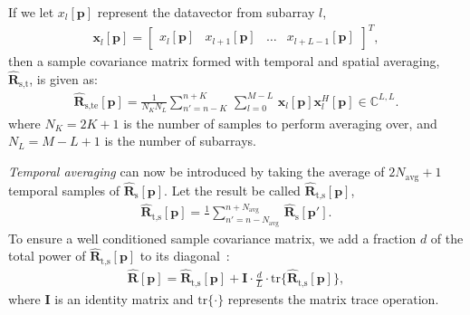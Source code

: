 \documentclass[12pt,journal,captionsoff,onecolumn]{IEEEtran}
\newcommand\bmat[1]{\begin{bmatrix}#1\end{bmatrix}}
\newcommand\tr{\text{tr}}
\newcommand\sumb[2]{\sum\limits_{#1}^{#2}\,}
\newcommand\T{^{\scriptscriptstyle T}}
\renewcommand\H{^{\scriptscriptstyle H}}
\renewcommand\vec[1]{\boldsymbol{#1}}
\newcommand\mat[1]{\boldsymbol{#1}}
\newcommand\1{\vec 1}
\newcommand\I{\mat I}
\newcommand*\p{\vec p}
\newcommand*\x{\vec x}
\newcommand*\eR{\mat{\hat R}}
\begin{document}
If we let $x_l[\p]$ represent the datavector from subarray $l$,
\begin{gather}
\x_l[\p] = \bmat{x_l[\p] & x_{l+1}[\p] & \dots & x_{l+L-1}[\p]}\T,
\end{gather}
then a sample covariance matrix formed with temporal and spatial averaging, $\eR_\text{s,t}$, is given as:
\begin{gather}
\eR_\text{s,te}[\p] =  \frac{1}{N_K N_L} \sumb{n'=n-K}{n+K}\sumb{l=0}{M-L} \x_l[\p]\x_l\H[\p] \in\mathbb{C}^{L,L}.\label{spatialR}
\end{gather}
where $N_K = 2K+1$ is the number of samples to perform averaging over, and $N_L = M-L+1$ is the number of subarrays.

\emph{Temporal averaging} can now be introduced by taking the average of $2N_\text{avg}+1$ temporal samples of $\eR_\text{s}[\p]$. Let the result be called $\eR_\text{t,s}[\p]$,
\begin{gather}
\eR_\text{t,s}[\p] = \frac{1}{} \sumb{n'=n-N_\text{avg}}{n+N_\text{avg}} \eR_\text{s}[\p'].
\end{gather}
To ensure a well conditioned sample covariance matrix, we add a fraction $d$ of the total power of $\eR_\text{t,s}[\p]$ to its diagonal~\cite{Synnevag2007}:
\begin{align}
\eR[\p] = \eR_\text{t,s}[\p] + \I \cdot \frac{d}{L} \cdot \tr\{\eR_\text{t,s}[\p]\},\label{finalR}
\end{align}
where $\I$ is an identity matrix and $\tr\{\cdot\}$ represents the matrix trace operation.
\end{document}
